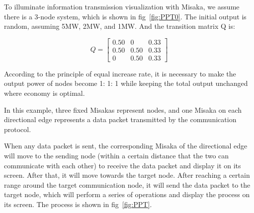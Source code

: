\documentclass[conference]{IEEEtran}
\begin{document}
To illuminate information transmission visualization with Misaka, we assume there is a 3-node system, which is shown in fig~\ref{fig:PPT0}. The initial output is random, assuming 5MW, 2MW, and 1MW. And the transition matrix Q is:

\begin{equation}
    Q=\left[\begin{array}{ccc}
    0.50 & 0 & 0.33 \\
    0.50 & 0.50 & 0.33 \\
    0 & 0.50 & 0.33
    \end{array}\right]
\end{equation}

According to the principle of equal increase rate, it is necessary to make the output power of nodes become 1: 1: 1 while keeping the total output unchanged where economy is optimal.

In this example, three fixed Misakas represent nodes, and one Misaka on each directional edge represents a data packet transmitted by the communication protocol.

When any data packet is sent, the corresponding Misaka of the directional edge will move to the sending node (within a certain distance that the two can communicate with each other) to receive the data packet and display it on its screen. After that, it will move towards the target node. After reaching a certain range around the target communication node, it will send the data packet to the target node, which will perform a series of operations and display the process on its screen. The process is shown in fig~\ref{fig:PPT}.
\end{document}
